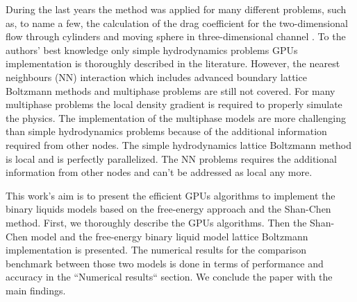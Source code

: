 \documentclass[mathpazo,sort,numbers]{cicp}
\begin{document}
During the last years the method was applied for many different problems, such as, to name a few, the calculation of the drag coefficient for the two-dimensional flow through cylinders \cite{tolke-twod} and moving sphere in three-dimensional channel \cite{tolke-GPU}. To the authors' best knowledge only simple hydrodynamics problems GPUs implementation is thoroughly described in the literature. However, the nearest neighbours (NN) interaction which includes advanced boundary lattice Boltzmann methods and multiphase problems are still not covered. For many multiphase problems the local density gradient is required to properly simulate the physics. The implementation of the multiphase models are more challenging than simple hydrodynamics problems because of the additional information required from other nodes. The simple hydrodynamics lattice Boltzmann method is local and is perfectly parallelized. The NN problems requires the additional information from other nodes and can't be addressed as local any more. 

This work's aim is to present the efficient GPUs algorithms to implement the binary liquids models based on the free-energy approach and the Shan-Chen method. First, we thoroughly describe the GPUs algorithms. Then the Shan-Chen model and the free-energy binary liquid model lattice Boltzmann implementation is presented. The numerical results for the comparison benchmark between those two models is done in terms of performance and accuracy in the ``Numerical results`` section. We conclude the paper with the main findings.
\end{document}
